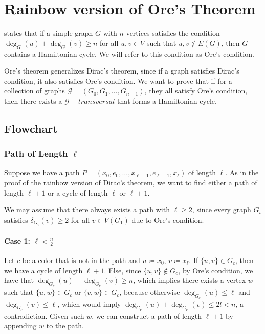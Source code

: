 
\chapter{Rainbow version of Ore's Theorem}

\cite{Ore_1960} states that if a simple graph $G$ with $n$ vertices satisfies the condition
$\deg_G(u) + \deg_G(v) \geq n$ for all $u, v \in V$ such that ${u, v} \not\in E(G)$, then $G$ contains a Hamiltonian cycle.
We will refer to this condition as Ore's condition.

Ore's theorem generalizes Dirac's theorem, since if a graph satisfies Dirac's condition, it also satisfies Ore's condition.
We want to prove that if for a collection of graphs $\mathcal{G} = (G_0, G_1, \ldots, G_{n-1})$, they all satisfy Ore's condition,
then there exists a $\mathcal{G}-transversal$ that forms a Hamiltonian cycle.

\section{Flowchart}

\subsection{Path of Length $\ell$}

Suppose we have a path $ P = (x_0, e_0, \dots, x_{\ell-1}, e_{\ell-1}, x_{\ell}) $ of length $ \ell $.
As in the proof of the rainbow version of Dirac's theorem,
we want to find either a path of length $ \ell+1 $ or a cycle of length $ \ell $ or $ \ell+1 $.

We may assume that there always exists a path with $ \ell \geq 2 $, since every graph 
$ G_i $ satisfies $ \delta_{G_i}(v) \geq 2 $ for all $ v \in V(G_1) $ due to Ore's condition.

\subsubsection{Case 1: \( \ell < \frac{n}{2} \)}

Let \( c \) be a color that is not in the path and \(u \coloneqq x_0\), \(v \coloneqq x_{\ell}\). 
If \( \{u, v\} \in G_c \), then we have a cycle of length \( \ell+1 \).
Else, since \( \{u, v\} \not\in G_c \), by Ore's condition, 
we have that \( \deg_{G_c}(u) + \deg_{G_c}(v) \geq n \), which implies there exists a 
vertex \( w \) such that \( \{u, w\} \in G_c \) or \( \{v, w\} \in G_c \), because otherwise
\( \deg_{G_c}(u) \leq \ell  \) and \( \deg_{G_c}(v) \leq \ell \), 
which would imply \( \deg_{G_c}(u) + \deg_{G_c}(v) \leq 2l < n \), a contradiction.
Given such \(w\), we can construct a path of length \( \ell+1 \) by appending \(w\) to the path.

